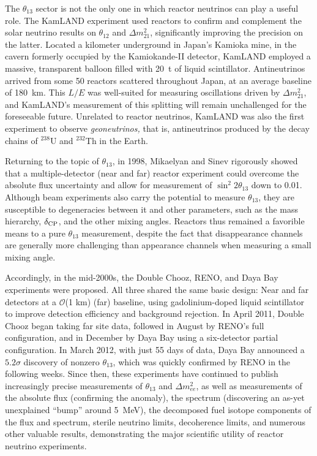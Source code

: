 \documentclass[../thesis.tex]{subfiles}
\begin{document}
The $\theta_{13}$ sector is not the only one in which reactor neutrinos can play a useful role. The KamLAND experiment used reactors to confirm and complement the solar neutrino results on $\theta_{12}$ and $\Delta m^2_{21}$, significantly improving the precision on the latter. Located a kilometer underground in Japan's Kamioka mine, in the cavern formerly occupied by the Kamiokande-II detector, KamLAND employed a massive, transparent balloon filled with 20~t of liquid scintillator. Antineutrinos arrived from some 50 reactors scattered throughout Japan, at an average baseline of 180~km. This $L/E$ was well-suited for measuring oscillations driven by $\Delta m^2_{21}$, and KamLAND's measurement of this splitting will remain unchallenged for the foreseeable future. Unrelated to reactor neutrinos, KamLAND was also the first experiment to observe \emph{geoneutrinos,} that is, antineutrinos produced by the decay chains of $^{238}$U and $^{232}$Th in the Earth.

Returning to the topic of $\theta_{13}$, in 1998, Mikaelyan and Sinev rigorously showed that a multiple-detector (near and far) reactor experiment could overcome the absolute flux uncertainty and allow for measurement of $\sin^2 2\theta_{13}$ down to 0.01. Although beam experiments also carry the potential to measure $\theta_{13}$, they are susceptible to degeneracies between it and other parameters, such as the mass hierarchy, $\delta_\text{CP}$, and the other mixing angles. Reactors thus remained a favorible means to a pure $\theta_{13}$ measurement, despite the fact that disappearance channels are generally more challenging than appearance channels when measuring a small mixing angle.

Accordingly, in the mid-2000s, the Double Chooz, RENO, and Daya Bay experiments were proposed. All three shared the same basic design: Near and far detectors at a $\mathcal{O}$(1 km) (far) baseline, using gadolinium-doped liquid scintillator to improve detection efficiency and background rejection. In April 2011, Double Chooz began taking far site data, followed in August by RENO's full configuration, and in December by Daya Bay using a six-detector partial configuration. In March 2012, with just 55 days of data, Daya Bay announced a $5.2\sigma$ discovery of nonzero $\theta_{13}$, which was quickly confirmed by RENO in the following weeks. Since then, these experiments have continued to publish increasingly precise measurements of $\theta_{13}$ and $\Delta m^2_{ee}$, as well as measurements of the absolute flux (confirming the anomaly), the spectrum (discovering an as-yet unexplained ``bump'' around 5~MeV), the decomposed fuel isotope components of the flux and spectrum, sterile neutrino limits, decoherence limits, and numerous other valuable results, demonstrating the major scientific utility of reactor neutrino experiments.
\end{document}

